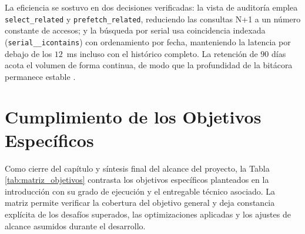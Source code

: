 \par La eficiencia se sostuvo en dos decisiones verificadas: la vista de auditoría emplea \texttt{select\_related} y \texttt{prefetch\_related}, reduciendo las consultas N+1 a un número constante de accesos; y la búsqueda por serial usa coincidencia indexada (\texttt{serial\_\_icontains}) con ordenamiento por fecha, manteniendo la latencia por debajo de los $12$~ms incluso con el histórico completo. La retención de $90$ días acota el volumen de forma continua, de modo que la profundidad de la bitácora permanece estable \cite{Django_v5_Doc}.

\section{Cumplimiento de los Objetivos Específicos}

\par Como cierre del capítulo y síntesis final del alcance del proyecto, la Tabla \ref{tab:matriz_objetivos} contrasta los objetivos específicos planteados en la introducción con su grado de ejecución y el entregable técnico asociado. La matriz permite verificar la cobertura del objetivo general y deja constancia explícita de los desafíos superados, las optimizaciones aplicadas y los ajustes de alcance asumidos durante el desarrollo.

